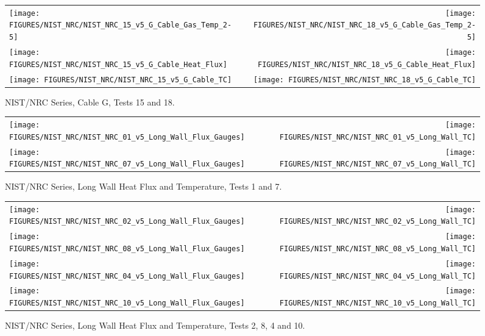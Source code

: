 \begin{figure}[h]
\begin{tabular*}{\textwidth}{l@{\extracolsep{\fill}}r}
\texttt{[image: FIGURES/NIST\_NRC/NIST\_NRC\_15\_v5\_G\_Cable\_Gas\_Temp\_2-5]} &
\texttt{[image: FIGURES/NIST\_NRC/NIST\_NRC\_18\_v5\_G\_Cable\_Gas\_Temp\_2-5]} \\
\texttt{[image: FIGURES/NIST\_NRC/NIST\_NRC\_15\_v5\_G\_Cable\_Heat\_Flux]} &
\texttt{[image: FIGURES/NIST\_NRC/NIST\_NRC\_18\_v5\_G\_Cable\_Heat\_Flux]} \\
\texttt{[image: FIGURES/NIST\_NRC/NIST\_NRC\_15\_v5\_G\_Cable\_TC]} &
\texttt{[image: FIGURES/NIST\_NRC/NIST\_NRC\_18\_v5\_G\_Cable\_TC]}
\end{tabular*}
\caption{NIST/NRC Series, Cable G, Tests 15 and 18.}
\label{NIST_NRC_G_15_and_18}
\end{figure}

\clearpage

\begin{figure}[h!]
\begin{tabular*}{\textwidth}{l@{\extracolsep{\fill}}r}
\texttt{[image: FIGURES/NIST\_NRC/NIST\_NRC\_01\_v5\_Long\_Wall\_Flux\_Gauges]} &
\texttt{[image: FIGURES/NIST\_NRC/NIST\_NRC\_01\_v5\_Long\_Wall\_TC]} \\
\texttt{[image: FIGURES/NIST\_NRC/NIST\_NRC\_07\_v5\_Long\_Wall\_Flux\_Gauges]} &
\texttt{[image: FIGURES/NIST\_NRC/NIST\_NRC\_07\_v5\_Long\_Wall\_TC]}

\end{tabular*}
\caption{NIST/NRC Series, Long Wall Heat Flux and Temperature, Tests 1 and 7.}
\label{NIST_NRC_Long_1}
\end{figure}

\begin{figure}[p]
\begin{tabular*}{\textwidth}{l@{\extracolsep{\fill}}r}
\texttt{[image: FIGURES/NIST\_NRC/NIST\_NRC\_02\_v5\_Long\_Wall\_Flux\_Gauges]} &
\texttt{[image: FIGURES/NIST\_NRC/NIST\_NRC\_02\_v5\_Long\_Wall\_TC]} \\
\texttt{[image: FIGURES/NIST\_NRC/NIST\_NRC\_08\_v5\_Long\_Wall\_Flux\_Gauges]} &
\texttt{[image: FIGURES/NIST\_NRC/NIST\_NRC\_08\_v5\_Long\_Wall\_TC]} \\
\texttt{[image: FIGURES/NIST\_NRC/NIST\_NRC\_04\_v5\_Long\_Wall\_Flux\_Gauges]} &
\texttt{[image: FIGURES/NIST\_NRC/NIST\_NRC\_04\_v5\_Long\_Wall\_TC]} \\
\texttt{[image: FIGURES/NIST\_NRC/NIST\_NRC\_10\_v5\_Long\_Wall\_Flux\_Gauges]} &
\texttt{[image: FIGURES/NIST\_NRC/NIST\_NRC\_10\_v5\_Long\_Wall\_TC]}

\end{tabular*}
\caption{NIST/NRC Series, Long Wall Heat Flux and Temperature, Tests 2, 8, 4 and 10.}
\label{NIST_NRC_Long_2}
\end{figure}

